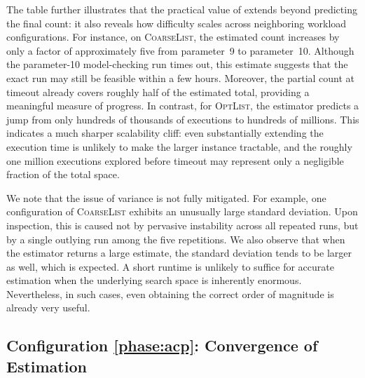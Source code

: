 The table further illustrates that the practical value of  \testor extends beyond predicting the final count: it also reveals how difficulty scales across neighboring workload configurations. For instance, on \textsc{CoarseList}, the estimated count increases by only a factor of approximately five from parameter~9 to parameter~10. Although the parameter-10 model-checking run times out, this estimate suggests that the exact run may still be feasible within a few hours. Moreover, the partial count at timeout already covers roughly half of the estimated total, providing a meaningful measure of progress. In contrast, for \textsc{OptList}, the estimator predicts a jump from only hundreds of thousands of executions to hundreds of millions. This indicates a much sharper scalability cliff: even substantially extending the execution time is unlikely to make the larger instance tractable, and the roughly one million executions explored before timeout may represent only a negligible fraction of the total space.

We note that the issue of variance is not fully mitigated.
For example, one configuration of \textsc{CoarseList} exhibits an unusually large standard deviation. 
Upon inspection, this is caused not by pervasive instability across all repeated runs, but by a single outlying run among the five repetitions. 
We also observe that when the estimator returns a large estimate, the standard deviation tends to be larger as well, which is expected. 
A short runtime is unlikely to suffice for accurate estimation when the underlying search space is inherently enormous. Nevertheless, in such cases, even obtaining the correct order of magnitude is already very useful.




\subsection{Configuration \ref{phase:acp}: Convergence of Estimation
}


